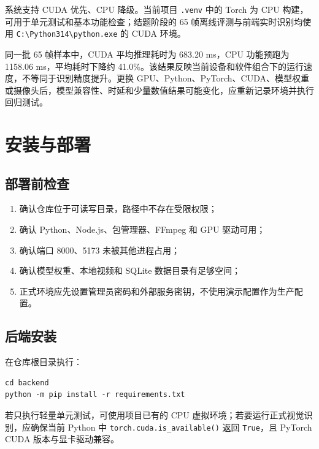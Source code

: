 系统支持 CUDA 优先、CPU 降级。当前项目 \texttt{.\allowbreak{}venv} 中的 Torch 为 CPU 构建，可用于单元测试和基本功能检查；结题阶段的 65 帧离线评测与前端实时识别均使用 \texttt{C:\allowbreak{}\textbackslash{}\allowbreak{}\allowbreak{}Python314\textbackslash{}\allowbreak{}python.\allowbreak{}exe} 的 CUDA 环境。

同一批 65 帧样本中，CUDA 平均推理耗时为 683.20 ms，CPU 功能预跑为 1158.06 ms，平均耗时下降约 41.0\%。该结果反映当前设备和软件组合下的运行速度，不等同于识别精度提升。更换 GPU、Python、PyTorch、CUDA、模型权重或摄像头后，模型兼容性、时延和少量数值结果可能变化，应重新记录环境并执行回归测试。

\section{安装与部署}\label{manual-ux5b89ux88c5ux4e0eux90e8ux7f72}

\subsection{部署前检查}\label{manual-ux90e8ux7f72ux524dux68c0ux67e5}

\begin{enumerate}
\def\labelenumi{\arabic{enumi}.}
\tightlist
\item
  确认仓库位于可读写目录，路径中不存在受限权限；
\item
  确认 Python、Node.js、包管理器、FFmpeg 和 GPU 驱动可用；
\item
  确认端口 8000、5173 未被其他进程占用；
\item
  确认模型权重、本地视频和 SQLite 数据目录有足够空间；
\item
  正式环境应先设置管理员密码和外部服务密钥，不使用演示配置作为生产配置。
\end{enumerate}

\subsection{后端安装}\label{manual-ux540eux7aefux5b89ux88c5}

在仓库根目录执行：

\begin{Verbatim}[breaklines=true,breakanywhere=true,fontsize=\small,frame=single,framesep=2mm,rulecolor=\color{STransLine}]
cd backend
python -m pip install -r requirements.txt
\end{Verbatim}

若只执行轻量单元测试，可使用项目已有的 CPU 虚拟环境；若要运行正式视觉识别，应确保当前 Python 中 \texttt{torch.\allowbreak{}cuda.\allowbreak{}is\_\allowbreak{}available()} 返回 \texttt{True}，且 PyTorch CUDA 版本与显卡驱动兼容。

